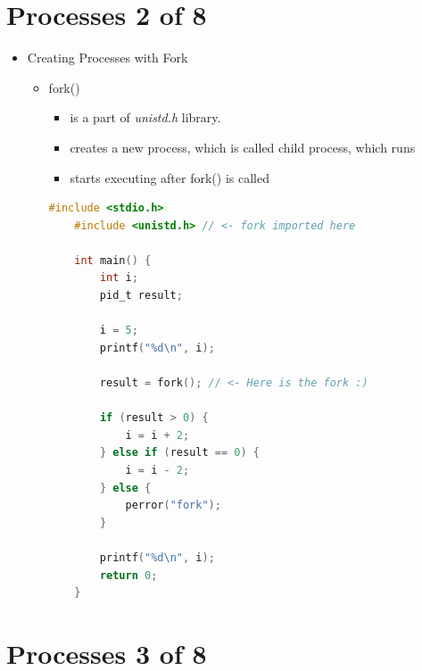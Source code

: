 \documentclass[12pt]{article}
\begin{document}
\bigskip

\section*{Processes 2 of 8}

\bigskip

\begin{itemize}
    \item Creating Processes with Fork
    \begin{itemize}
        \item fork()
        \begin{itemize}
            \item is a part of \textit{unistd.h} library.
            \item creates a new process, which is called child process, which runs
            \item starts executing after fork() is called
        \end{itemize}

        \bigskip

    \begin{lstlisting}[language=c]
    #include <stdio.h>
    #include <unistd.h> // <- fork imported here

    int main() {
        int i;
        pid_t result;

        i = 5;
        printf("%d\n", i);

        result = fork(); // <- Here is the fork :)

        if (result > 0) {
            i = i + 2;
        } else if (result == 0) {
            i = i - 2;
        } else {
            perror("fork");
        }

        printf("%d\n", i);
        return 0;
    }
    \end{lstlisting}

    \end{itemize}
\end{itemize}

\bigskip

\section*{Processes 3 of 8}

\bigskip
\end{document}
